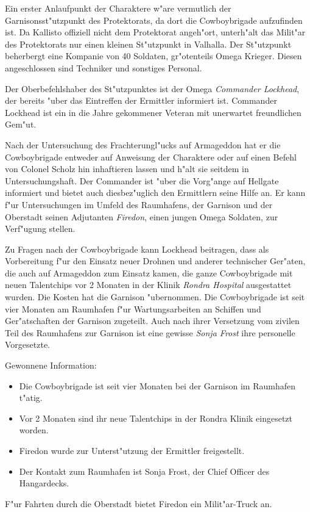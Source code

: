 
Ein erster Anlaufpunkt der Charaktere w"are vermutlich der Garnisonsst"utzpunkt des Protektorats, da dort die Cowboybrigade aufzufinden ist. Da Kallisto offiziell nicht dem Protektorat angeh"ort, unterh"alt das Milit"ar des Protektorats nur einen kleinen St"utzpunkt in Valhalla. Der St"utzpunkt beherbergt eine Kompanie von 40 Soldaten, gr"o\3tenteils Omega Krieger. Diesen angeschlossen sind Techniker und sonstiges Personal.

Der Oberbefehlshaber des St"utzpunktes ist der Omega \emph{Commander Lockhead}, der bereits "uber das Eintreffen der Ermittler informiert ist. Commander Lockhead ist ein in die Jahre gekommener Veteran mit unerwartet freundlichen Gem"ut. 

Nach der Untersuchung des Frachterungl"ucks auf Armageddon hat er die Cowboybrigade entweder auf Anweisung der Charaktere oder auf einen Befehl von Colonel Scholz hin inhaftieren lassen und h"alt sie seitdem in Untersuchungshaft. Der Commander ist "uber die Vorg"ange auf Hellgate informiert und bietet auch diesbez"uglich den Ermittlern seine Hilfe an. Er kann f"ur Untersuchungen im Umfeld des Raumhafens, der Garnison und der Oberstadt seinen Adjutanten \emph{Firedon}, einen jungen Omega Soldaten, zur Verf"ugung stellen. 

Zu Fragen nach der Cowboybrigade kann Lockhead beitragen, dass als Vorbereitung f"ur den Einsatz neuer Drohnen und anderer technischer Ger"aten, die auch auf Armageddon zum Einsatz kamen, die ganze Cowboybrigade mit neuen Talentchips vor 2 Monaten in der Klinik \emph{Rondra Hospital} ausgestattet wurden. Die Kosten hat die Garnison "ubernommen. Die Cowboybrigade ist seit vier Monaten am Raumhafen f"ur Wartungsarbeiten an Schiffen und Ger"atschaften der Garnison zugeteilt. Auch nach ihrer Versetzung vom zivilen Teil des Raumhafens zur Garnison ist eine gewisse \emph{Sonja Frost} ihre personelle Vorgesetzte.

\begin{remarks}
	Gewonnene Information: 
	
	\begin{itemize}
		\item Die Cowboybrigade ist seit vier Monaten bei der Garnison im Raumhafen t"atig. 
		\item Vor 2 Monaten sind ihr neue Talentchips in der Rondra Klinik eingesetzt worden.
		\item Firedon wurde zur Unterst"utzung der Ermittler freigestellt.
		\item Der Kontakt zum Raumhafen ist Sonja Frost, der Chief Officer des Hangardecks.
	\end{itemize}

	F"ur Fahrten durch die Oberstadt bietet Firedon ein Milit"ar-Truck an.
	 
\end{remarks}

